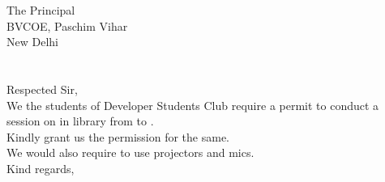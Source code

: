 \documentclass[12pt,a4paper]{article} %
\begin{document}
	

	\hspace{-8mm}
	The Principal \\
	BVCOE, Paschim Vihar\\
	New Delhi\\
	\linebreak
	\\
	\linebreak
	\textbf{}\\
	\linebreak
	Respected Sir,\\
	
	\vspace{-5mm}
	\hspace{8mm}
	We the students of Developer Students Club require a permit to conduct a session on 
	in library from 
	to 
	.\\
	Kindly grant us the permission for the same. \\
	We would also require to use projectors and mics.\\
	\linebreak
	Kind regards,\\
	\\
	
\end{document}
